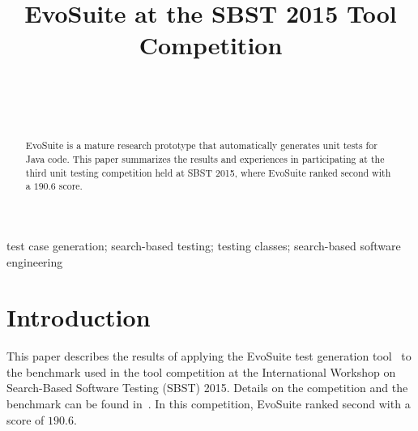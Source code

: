 \documentclass[10pt,conference,compsocconf]{IEEEtran}
\newcommand{\EVOSUITE}{{\sc EvoSuite}\xspace}
\begin{document}
\title{EvoSuite at the SBST 2015 Tool Competition}

\author{
\\
\and
{}
\\
}

\maketitle

\begin{abstract}
  \EVOSUITE is a mature research prototype that automatically generates unit tests for Java code. 
  This paper summarizes the results and experiences in participating at the third unit testing competition held at SBST 2015,
  where \EVOSUITE ranked second with a $190.6$ score.
\end{abstract}

\begin{IEEEkeywords}
  test case generation; search-based testing; testing classes;
  search-based software engineering
\end{IEEEkeywords}


\section{Introduction}

This paper describes the results of applying the \EVOSUITE test
generation tool~\cite{FrA11c} to the benchmark used in the tool
competition at the International Workshop on Search-Based Software
Testing (SBST) 2015.  Details on the competition and the benchmark can
be found in~\cite{sbst2015}. In this competition, \EVOSUITE ranked
second with a score of $190.6$.

\end{document}
